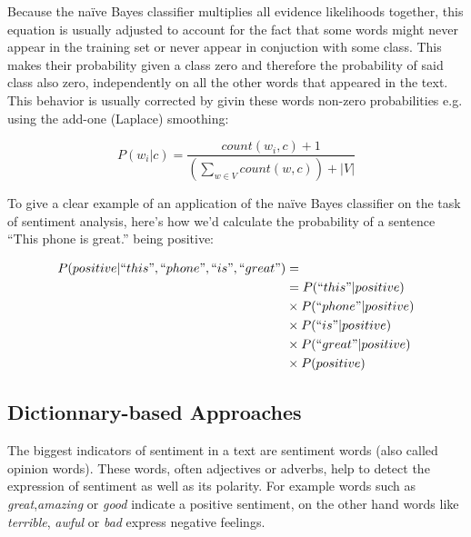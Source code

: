 Because the na\"ive Bayes classifier multiplies all evidence likelihoods together, this equation is usually adjusted to account for the fact that some words might never appear in the training set or never appear in conjuction with some class. This makes their probability given a class zero and therefore the probability of said class also zero, independently on all the other words that appeared in the text. This behavior is usually corrected by givin these words non-zero probabilities e.g. using the add-one (Laplace) smoothing\cite{bagofwords}:

$$ P(w_{i}|c) = \frac{count(w_{i},c) + 1}{(\sum_{w \in V} count(w,c)) + |V|} $$

To give a clear example of an application of the na\"ive Bayes classifier on the task of sentiment analysis, here's how we'd calculate the probability of a sentence ``This phone is great.'' being positive:

\begin{align*}
P(positive|``this",`` phone ",``is",``great")&=\\ 
&=P(``this"|positive) \\
&\times P(``phone"|positive) \\
&\times P(``is"|positive) \\
&\times P(``great"|positive)\\
&\times P(positive)
\end{align*}

\subsection{Dictionnary-based Approaches}
The biggest indicators of sentiment in a text are sentiment words (also called opinion words). These words, often adjectives or adverbs, help to detect the expression of sentiment as well as its polarity. For example words such as \textit{great},\textit{amazing} or \textit{good} indicate a positive sentiment, on the other hand words like \textit{terrible}, \textit{awful} or \textit{bad} express negative feelings. \cite{liu_2015}
  
